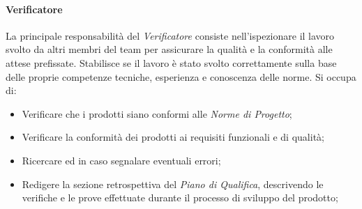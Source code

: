 \documentclass{article}
\begin{document}
        \paragraph{Verificatore}\label{verificatore} La principale responsabilità del \textit{Verificatore} consiste nell'ispezionare il lavoro svolto da altri membri del team per assicurare la qualità e la conformità alle attese prefissate. Stabilisce se il lavoro è stato svolto correttamente sulla base delle proprie competenze tecniche, esperienza e conoscenza delle norme. Si occupa di:
        \begin{itemize}
            \item Verificare che i prodotti siano conformi alle \textit{Norme di Progetto};
            \item Verificare la conformità dei prodotti ai requisiti funzionali e di qualità;
            \item Ricercare ed in caso segnalare eventuali errori;
            \item Redigere la sezione retrospettiva del \textit{Piano di Qualifica}, descrivendo le verifiche e le prove effettuate durante il processo di sviluppo del prodotto;
        \end{itemize}          
\end{document}
